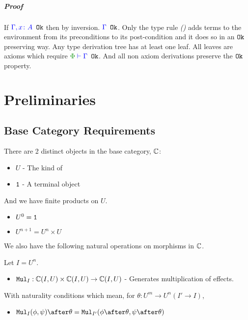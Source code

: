 \documentclass{report}
\begin{document}
\paragraph{Proof}
If ${\color{blue} \Gamma, x\colon A} \texttt{ Ok}$ then by inversion. ${\color{blue} \Gamma} \texttt{ Ok}$.
Only the type rule \textit{(\vweaken)} adds terms to the environment from its preconditions to its post-condition and it does so in an $\texttt{Ok}$ preserving way. Any type derivation tree has at least one leaf. All leaves are axioms which require $\oke{\P}{\G}$. And all non axiom derivations preserve the $\texttt{Ok}$ property.



\chapter{Preliminaries}

\section{Base Category Requirements}
There are 2 distinct objects in the base category, $\mathbb{C}$:

\begin{itemize}
    \item $U$ - The kind of \effect
    \item $\texttt{1}$ - A terminal object
\end{itemize}

And we have finite products on $U$.

\begin{itemize}
    \item $U^0 = \texttt{1}$
    \item $U^{n+1} = U^n \times U$
\end{itemize}

We also have the following natural operations on morphisms in $\mathbb{C}$.

Let $I = U^n$.

\begin{itemize}
    \item $\texttt{Mul}_I:\mathbb{C}(I, U)\times\mathbb{C}(I, U)\rightarrow\mathbb{C}(I, U)$ - Generates multiplication of effects.
\end{itemize}

With naturality conditions which mean, for $\theta: U^m \rightarrow U^n (I' \rightarrow I)$,
\begin{itemize}
    \item $\Mul_{I}(\phi,\psi)\after\theta = \Mul_{I'}(\phi\after\theta,\psi\after\theta)$
\end{itemize}
\end{document}
